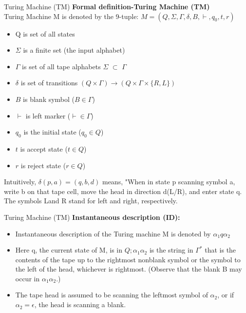 \documentclass{beamer}
\begin{document}
\begin{frame}{Turing Machine (TM)}
	\textbf{Formal definition-Turing Machine (TM)}\\
	Turing Machine M is denoted by the 9-tuple: $M=(Q,\Sigma, \Gamma, \delta,B,\vdash,q_0, t,r)$
	
	\begin{itemize}
		\item Q is set of all states
		\item $\Sigma$ is a finite set (the input alphabet)
		\item $\Gamma$ is set of all tape alphabets $\Sigma$ $\subset$ $\Gamma$
		\item $\delta$ is set of transitions $(Q\times \Gamma)\rightarrow (Q\times \Gamma \times \{R,L\})$
		\item $B$ is blank symbol ($B \in \Gamma$)
		\item $\vdash$ is left marker  ($\vdash   \in \Gamma$)
		\item $q_0$ is the initial state ($q_0 \in Q$)
		\item $t$ is accept state ($t \in Q$)
		\item $r$ is reject state ($r \in Q$)
	\end{itemize}
Intuitively, $\delta (p, a) = (q, b, d)$ means, "When in state p scanning symbol a, 
write b on that tape cell, move the head in direction d(L/R), and enter state q.
The symbols Land R stand for left and right, respectively.
\end{frame}	
\begin{frame}{Turing Machine (TM)}
	\textbf{Instantaneous description (ID):}\\
	\begin{itemize}
		\item Instantaneous description of the Turing machine M is denoted by $\alpha_1q\alpha_2$
		\item Here q, the current state of M, is in $Q; \alpha_1\alpha_2$ is the string in $\Gamma^*$ that is the contents of the tape up to 
		the rightmost nonblank symbol or the symbol to the left of the head, whichever is rightmost. 
		(Observe that the blank B may occur in $\alpha_1\alpha_2$.)
		\item The tape head is assumed to be scanning the leftmost symbol of $\alpha_2$, or if $\alpha_2 = \epsilon$, the head is 
		scanning a blank.

	\end{itemize}
\end{frame}	
\end{document}
